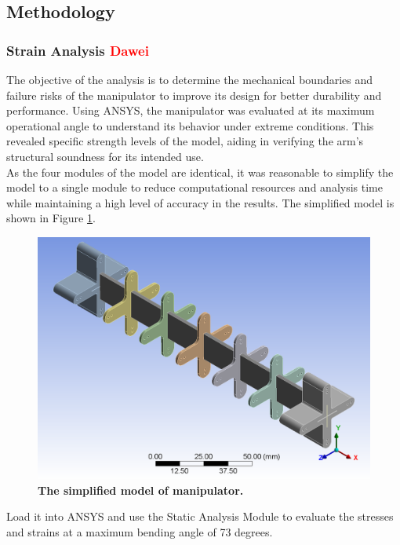 \subsection{Methodology}
\subsubsection{Strain Analysis \textcolor{red}{Dawei}}
The objective of the analysis is to determine the mechanical boundaries and failure risks of the manipulator to 
improve its design for better durability and performance. Using ANSYS, the manipulator was evaluated at its maximum 
operational angle to understand its behavior under extreme conditions. This revealed specific strength levels of the 
model, aiding in verifying the arm's structural soundness for its intended use. \\
As the four modules of the model are identical, it was reasonable to simplify the model to a single module to 
reduce computational resources and analysis time while maintaining a high level of accuracy in the results. The 
simplified model is shown in Figure \ref{fig:sim_model}.
\begin{figure}[H] %
    \centering
    \captionsetup{labelsep=colon}
    \includegraphics[width=1.0\textwidth]{Image/Design/model.png} 
    \caption[The simplified model of manipulator]
    {\centering \textbf{The simplified model of manipulator.}}
    \label{fig:sim_model}
\end{figure}
Load it into ANSYS and use the Static Analysis Module to evaluate the stresses and strains at a maximum bending 
angle of 73 degrees. \\
